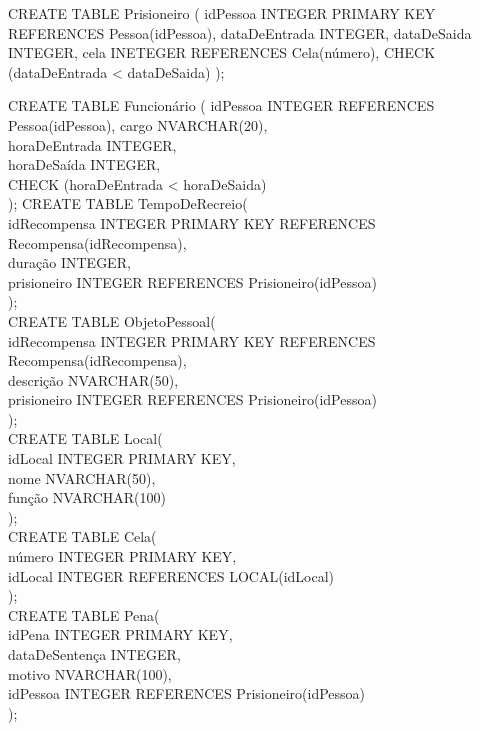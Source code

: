 \documentclass{article}
\begin{document}
\noindent
CREATE TABLE Prisioneiro (\newline
idPessoa	INTEGER PRIMARY KEY REFERENCES Pessoa(idPessoa),\newline
dataDeEntrada	INTEGER,\newline
dataDeSaida	INTEGER,\newline
cela		INETEGER REFERENCES Cela(número),\newline
CHECK	(dataDeEntrada < dataDeSaida)\newline
);\newline

CREATE TABLE Funcionário (\newline
idPessoa	INTEGER REFERENCES Pessoa(idPessoa),\newline
cargo		NVARCHAR(20),\\
horaDeEntrada	INTEGER,\\
horaDeSaída	INTEGER,\\
CHECK (horaDeEntrada < horaDeSaida)\\
);
\newpage
CREATE TABLE TempoDeRecreio(\\
idRecompensa	INTEGER PRIMARY KEY REFERENCES Recompensa(idRecompensa),\\
duração		INTEGER,\\
prisioneiro	INTEGER REFERENCES Prisioneiro(idPessoa)\\
);\\

CREATE TABLE ObjetoPessoal(\\
idRecompensa	INTEGER PRIMARY KEY REFERENCES Recompensa(idRecompensa),\\
descrição	NVARCHAR(50),\\
prisioneiro 	INTEGER REFERENCES Prisioneiro(idPessoa)\\
);\\

CREATE TABLE Local(\\
idLocal		INTEGER PRIMARY KEY,\\
nome		NVARCHAR(50),\\
função		NVARCHAR(100)\\
);\\

CREATE TABLE Cela(\\
número		INTEGER PRIMARY KEY,\\
idLocal		INTEGER REFERENCES LOCAL(idLocal)\\
);\\

CREATE TABLE Pena(\\
idPena 		INTEGER PRIMARY KEY,\\
dataDeSentença	INTEGER,\\
motivo		NVARCHAR(100),\\
idPessoa	INTEGER REFERENCES Prisioneiro(idPessoa)\\
);
\end{document}

